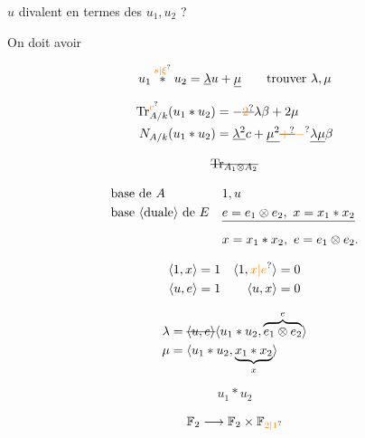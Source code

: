 
 $u$ divalent en termes des $u_1,u_2$ ?


 On doit avoir

\[ u_1\overset{\unsure{s|\xi}}{*}u_2=\underline{\lambda}u+\underline{\mu}\qquad\text{trouver }\lambda,\mu \]

\[
\begin{aligned}
 \mathrm{Tr}_{A/k}^{\unsure{c}}(u_1*u_2)&=-\deleted{\unsure{2}}\lambda\beta+2\mu\\
 N_{A/k}(u_1*u_2)&=\underline{\lambda^2}c+\underline{\mu^2}\deleted{\unsure{+}}\unsure{-}\underline{\lambda\mu}\beta
\end{aligned}
\]

\[ \deleted{\mathrm{Tr}_{A_1\otimes A_2}} \]

\[
\begin{aligned}
&\text{base de }A &&1,u\\
&\text{base \inserted{duale} de }E &&
\deleted{e=e_1\otimes e_2,\ x=x_1*x_2}\\
&&&x=x_1*x_2,\ e=e_1\otimes e_2.
\end{aligned}
\]

\[
\begin{aligned}
\langle1,x\rangle&=1 &\langle1,\unsure{x|e}\rangle&=0\\
\langle{u},e\rangle&=1 &\langle u,x\rangle&=0
\end{aligned}
\]

\[
\begin{aligned}
\lambda&=\deleted{\langle u,e\rangle}\langle u_1*u_2,\overbrace{e_1\otimes e_2}^{e}\rangle\\
\mu&=\langle u_1*u_2,\underbrace{x_1*x_2}_{x}\rangle
\end{aligned}
\]

\[ u_1*u_2 \]

\[ \mathbb F_2\longrightarrow\mathbb F_2\times\mathbb F_{\unsure{2|1}} \]


